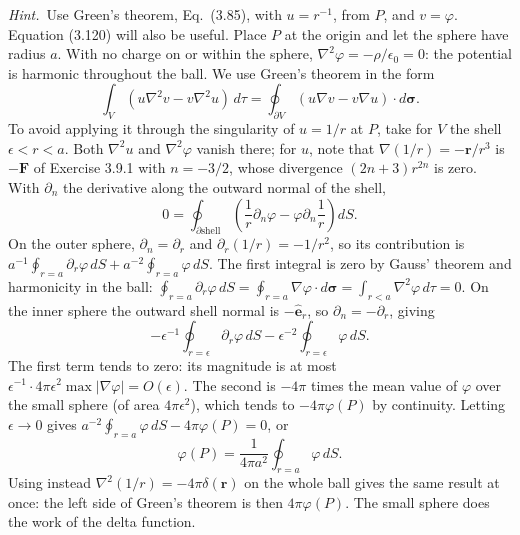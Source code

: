 \emph{Hint.}~Use Green's theorem, Eq.~(3.85), with $u=r^{-1}$, 
from $P$, and $v=\varphi$. Equation (3.120) will also be useful.
\solution
{}
Place $P$ at the origin and let the sphere have radius $a$.
With no charge on or within the sphere,
$\nabla^2\varphi=-\rho/\epsilon_0=0$: the potential is harmonic
throughout the ball. We use Green's theorem in the form
\[
\int_V(u\nabla^2v-v\nabla^2u)\,d\tau
=\oint_{\partial V}(u\nabla v-v\nabla u)\cdot d\boldsymbol\sigma.
\]
To avoid applying it through the singularity of $u=1/r$ at $P$, take
for $V$ the shell $\epsilon<r<a$. Both $\nabla^2u$ and
$\nabla^2\varphi$ vanish there; for $u$, note that
$\nabla(1/r)=-\mathbf r/r^3$ is $-\mathbf F$ of Exercise 3.9.1 with
$n=-3/2$, whose divergence $(2n+3)r^{2n}$ is zero. With $\partial_n$
the derivative along the outward normal of the shell,
\[
0=\oint_{\partial\text{shell}}
\left(\frac1r\partial_n\varphi-\varphi\partial_n\frac1r\right)dS.
\]
On the outer sphere, $\partial_n=\partial_r$ and
$\partial_r(1/r)=-1/r^2$, so its contribution is
$a^{-1}\oint_{r=a}\partial_r\varphi\,dS+
a^{-2}\oint_{r=a}\varphi\,dS$.
The first integral is zero by Gauss' theorem and harmonicity in the
ball:
$\oint_{r=a}\partial_r\varphi\,dS
=\oint_{r=a}\nabla\varphi\cdot d\boldsymbol\sigma
=\int_{r<a}\nabla^2\varphi\,d\tau=0$.
On the inner sphere the outward shell normal is $-\hat{\mathbf e}_r$,
so $\partial_n=-\partial_r$, giving
\[
-\epsilon^{-1}\oint_{r=\epsilon}\partial_r\varphi\,dS
-\epsilon^{-2}\oint_{r=\epsilon}\varphi\,dS.
\]
The first term tends to zero: its magnitude is at most
$\epsilon^{-1}\cdot4\pi\epsilon^2\max|\nabla\varphi|=O(\epsilon)$.
The second is $-4\pi$ times the mean value of $\varphi$ over the small
sphere (of area $4\pi\epsilon^2$), which tends to $-4\pi\varphi(P)$ by
continuity.
Letting $\epsilon\to0$ gives
$a^{-2}\oint_{r=a}\varphi\,dS-4\pi\varphi(P)=0$, or
\[
\boxed{\varphi(P)=\frac1{4\pi a^2}\oint_{r=a}\varphi\,dS}.
\]
Using instead $\nabla^2(1/r)=-4\pi\delta(\mathbf r)$ on the whole ball
gives the same result at once: the left side of Green's theorem is
then $4\pi\varphi(P)$. The small sphere does the work of the delta
function.

